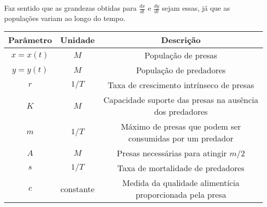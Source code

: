 Faz sentido que as grandezas obtidas para $\frac{dx}{dt}$ e $\frac{dy}{dt}$ sejam essas, já que as populações variam ao longo do tempo.

\begin{center}
\begin{tabular}{| c | c | c |}
\hline
Parâmetro & Unidade & Descrição\\
\hline
$x=x(t)$ & $M$ & População de presas\\
$y=y(t)$ & $M$ & População de predadores\\
$r$ & $1/T$ & Taxa de crescimento intrínseco de presas\\
$K$ & $M$ & Capacidade suporte das presas na ausência dos predadores\\
$m$ & $1/T$ & Máximo de presas que podem ser consumidas por um predador\\
$A$ & $M$ & Presas necessárias para atingir $m/2$\\
$s$ & $1/T$ & Taxa de mortalidade de predadores\\
$c$ & constante & Medida da qualidade alimentícia proporcionada pela presa\\
\hline
\end{tabular}
\end{center}


